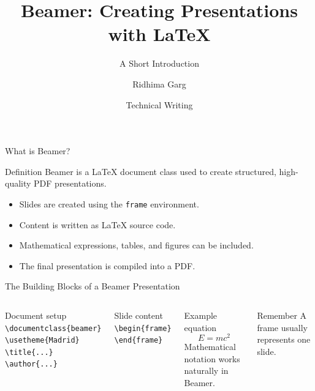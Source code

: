 \documentclass[aspectratio=169,11pt]{beamer}
\title[Beamer with LaTeX]{Beamer: Creating Presentations with LaTeX}
\subtitle{A Short Introduction}
\author{Ridhima Garg}
\institute{2025UCP1648}
\date{Technical Writing }
\begin{document}
\begin{frame}
    \titlepage
\end{frame}

\begin{frame}{What is Beamer?}
    \begin{block}{Definition}
        Beamer is a LaTeX document class used to create structured, high-quality PDF presentations.
    \end{block}

    \vspace{0.25cm}
    \begin{itemize}
        \item Slides are created using the \texttt{frame} environment.
        \item Content is written as LaTeX source code.
        \item Mathematical expressions, tables, and figures can be included.
        \item The final presentation is compiled into a PDF.
    \end{itemize}
\end{frame}

\begin{frame}{The Building Blocks of a Beamer Presentation}
    \begin{columns}[T,onlytextwidth]
        \begin{block}{Document setup}
            \small
            \texttt{\textbackslash documentclass\{beamer\}}\\[0.12cm]
            \texttt{\textbackslash usetheme\{Madrid\}}\\[0.12cm]
            \texttt{\textbackslash title\{...\}}\\
            \texttt{\textbackslash author\{...\}}
        \end{block}
        \begin{block}{Slide content}
            \small
            \texttt{\textbackslash begin\{frame\}}\\
            \texttt{\textbackslash end\{frame\}}
        \end{block}

        \begin{exampleblock}{Example equation}
            \[
                E = mc^2
            \]
            \centering
            \small Mathematical notation works naturally in Beamer.
        \end{exampleblock}
        \begin{alertblock}{Remember}
            A frame usually represents one slide.
        \end{alertblock}
    \end{columns}
\end{frame}
\end{document}
